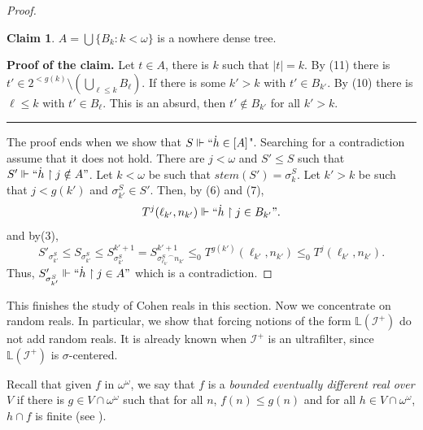 \documentclass{amsart}
\theoremstyle{definition}
\newtheorem{claim}[theorem]{Claim}
\theoremstyle{remark}
\numberwithin{equation}{section}
\newcommand{\li}{\mathbb{L}(\mathcal{I}^+)}
\newcommand{\id}{\mathcal{I}}
\newenvironment{proofclaim}[1][Proof of the claim]{\textbf{#1.} }{\hfill \rule{0.5em}{0.5em}}
\begin{document}
\begin{proof}
\begin{claim}
$A=\bigcup\{B_k:k<\omega\}$ is a nowhere dense tree.
\end{claim}
\begin{proofclaim}
    Let $t\in A$, there is $k$ such that $|t|=k$. By (11) there is $t'\in 2^{<g(k)}\setminus (\bigcup_{\ell\leq k}B_{\ell})$. If there is some $k'>k$ with $t'\in B_{k'}$. By (10) there is $\ell\leq k$ with $t'\in B_\ell$. This is an absurd, then $t'\notin B_{k'}$ for all $k'>k$.
\end{proofclaim}

The proof ends when we show that $S\Vdash``\dot h \in [A]$". Searching for a contradiction assume that it does not hold. There are $j<\omega$ and $S'\leq S$ such that $S'\Vdash``\dot h\upharpoonright j\notin A"$. Let $k<\omega$ be such that $stem(S')=\sigma^{S}_k$. Let $k'>k$ be  such that $j<g(k')$ and $\sigma^S_{k'}\in S'$. Then, by (6) and (7),
\begin{displaymath}
    T^j(\ell_{k'}, n_{k'})\Vdash ``\dot h\upharpoonright j\in B_{k'}".
\end{displaymath}
and by(3), 
\[
S'_{\sigma^S_{k'}}\leq S_{\sigma^S_{k'}}\leq S^{k'+1}_{\sigma^S_{k'}}=S^{k'+1}_{{\sigma^S_{\ell_{k'}}}^\frown n_{k'}}\leq_0 T^{g(k')}(\ell_{k'},n_{k'})\leq_0  T^j(\ell_{k'}, n_{k'}).
\]
Thus, $S'_{\sigma^S_{k'}}\Vdash`` \dot h\upharpoonright j\in A"$ which is a contradiction.
\end{proof}

This finishes the study of Cohen reals in this section. Now we concentrate on random reals. In particular, we show that forcing notions of the form $\li$ do not add random reals. It is already known when $\id^+$ is an ultrafilter, since $\mathbb{L}(\id^+)$ is $\sigma$-centered.

Recall that given $f$ in $\omega^\omega$, we say that $f$ is a \emph{bounded eventually different real over} $V$ if there is $g\in V\cap \omega^\omega$ such that for all $n$, $f(n)\leq g(n)$ and for all $h\in V\cap \omega^\omega$, $h\cap f$ is finite (see \cite{barto}). 
\end{document}
